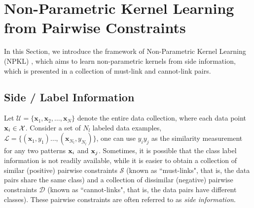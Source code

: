 %
%

\section{Non-Parametric Kernel Learning from Pairwise Constraints}
\label{sec:NPK}

In this Section, we introduce the framework of Non-Parametric Kernel Learning
(NPKL) \cite{icml/HoiJL07,icml/ZhuangTH09}, which aims to learn
non-parametric kernels from side information, which  is presented in a collection of
must-link and cannot-link pairs.

\subsection{Side / Label Information}

Let $\mathcal{U} = \{\mathbf{x}_1, \mathbf{x}_2, \ldots, \mathbf{x}_N\}$ denote
the entire data collection, where each data point $\mathbf{x}_i \in {\cal X}$. Consider a
set of $N_l$ labeled data examples,
$\mathcal{L}=\{(\mathbf{x}_1,y_1)\ldots,(\mathbf{x}_{N_l},y_{N_l})\}$, one can
use $y_iy_j$ as the similarity measurement for any two patterns ${\bf x}_i$ and ${\bf x}_j$.
Sometimes, it is possible that the class label information is not readily available, while
it is easier to obtain a collection of similar (positive) pairwise constraints
$\mathcal{S}$ (known as ``must-links", that is, the data pairs share the same class) and a
collection of dissimilar (negative) pairwise constraints $\mathcal{D}$ (known as
``cannot-links", that is, the data pairs have different classes). These pairwise constraints
are often referred to as \emph{side information}.

